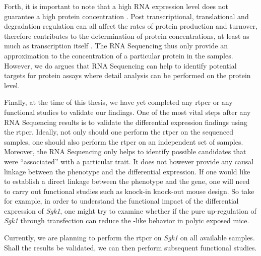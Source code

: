 \documentclass[12pt]{scrbook}
\newcommand*{\glng}{\glsentrylong}
\begin{document}
Forth, it is important to note that a high RNA expression level does not guarantee a high protein concentration \citep{Vogel2012}.
Post transcriptional, translational and degradation regulation can all affect the rates of protein production and turnover, therefore contributes to the determination of protein concentrations, at least as much as transcription itself \citep{Vogel2012}.
The RNA Sequencing thus only provide an approximation to the concentration of a particular protein in the samples.
However, we do argues that RNA Sequencing can help to identify potential targets for protein assays where detail analysis can be performed on the protein level.

Finally, at the time of this thesis, we have yet completed any \gls{rtpcr} or any functional studies to validate our findings.
One of the most vital steps after any RNA Sequencing results is to validate the differential expression findings using the \gls{rtpcr}.
Ideally, not only should one perform the \gls{rtpcr} on the sequenced samples, one should also perform the \gls{rtpcr} on an independent set of samples. 
Moreover, the RNA Sequencing only helps to identify possible candidates that were ``associated'' with a particular trait.
It does not however provide any causal linkage between the phenotype and the differential expression.
If one would like to establish a direct linkage between the phenotype and the gene, one will need to carry out functional studies such as knock-in knock-out mouse design.
So take for example, in order to understand the functional impact of the differential expression of \textit{Sgk1}, one might try to examine whether if the pure up-regulation of \textit{Sgk1} through transfection can reduce the \glng{scz}-like behavior in \gls{polyic} exposed mice.

Currently, we are planning to perform the \gls{rtpcr} on \textit{Sgk1} on all available samples. 
Shall the results be validated, we can then perform subsequent functional studies. 

\newpage
\end{document}
